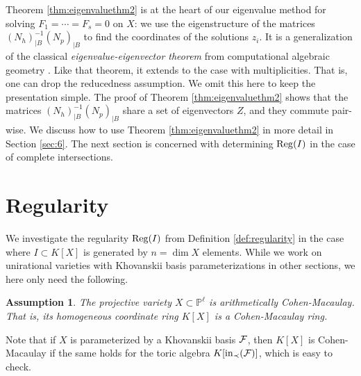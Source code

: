 \documentclass[12pt]{article}
\newtheorem{assum}[thm]{Assumption}
\theoremstyle{definition}
\theoremstyle{remark}
\begin{document}
Theorem \ref{thm:eigenvaluethm2} is at the heart of our eigenvalue method for solving $F_1 = \cdots = F_s = 0$ on $X$: we use the eigenstructure of the matrices $(N_h)_{|B}^{-1} (N_p)_{|B}$ to find the coordinates of the solutions $z_i$. It is a generalization of the classical \emph{eigenvalue-eigenvector theorem} from computational algebraic geometry \cite[Chapter 2, \S 4, Theorem 4.5]{cox2006using}. Like that theorem, it extends to the case with multiplicities. That is, one can drop the reducedness assumption. We omit this here to keep the presentation simple. 
The proof of Theorem \ref{thm:eigenvaluethm2} shows that the matrices $(N_h)_{|B}^{-1} (N_p)_{|B}$ share a set of eigenvectors $Z$, and they commute pair-wise. We discuss how to use Theorem \ref{thm:eigenvaluethm2} in more detail in Section \ref{sec:6}. The next section is concerned with determining ${\rm Reg}(I)$ in the case of complete intersections. 


\section{Regularity} \label{sec:5}
We investigate the regularity ${\rm Reg}(I)$ from Definition \ref{def:regularity} in the case where $I \subset K[X]$ is generated by $n = \dim X$ elements. While we work on unirational varieties with Khovanskii basis parameterizations in other sections, we here only need the following. 
\begin{assum} \label{assum:ACM}
The projective variety $X \subset \mathbb{P}^\ell$ is arithmetically Cohen-Macaulay. That is, its homogeneous coordinate ring $K[X]$ is a Cohen-Macaulay ring. 
\end{assum} 
Note that if $X$ is parameterized by a Khovanskii basis ${\cal F}$, then $K[X]$ is Cohen-Macaulay if the same holds for the toric algebra $K[{\rm in}_\prec({\cal F})]$, which is easy to check.
\end{document}
